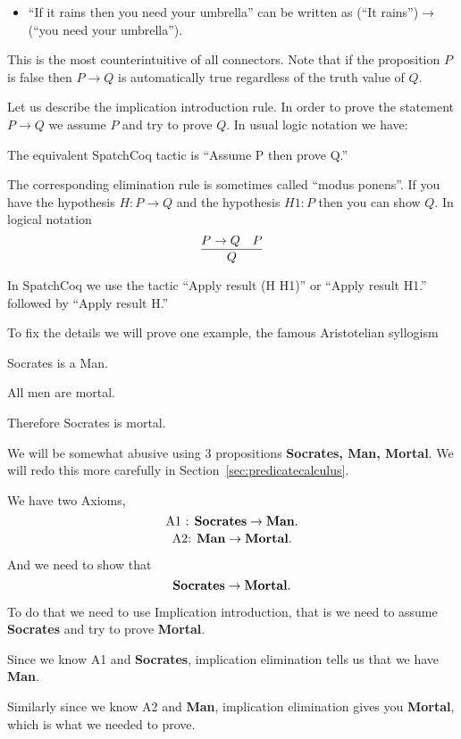\begin{itemize}
\item ``If it rains then you need your umbrella'' can be written as (``It rains'')$\rightarrow$(``you need your umbrella'').

\end{itemize}
This is the most counterintuitive of all connectors. Note that if the proposition $P$ is false then $P\rightarrow Q$ is automatically true regardless of the truth value of $Q$.

Let us describe the implication introduction rule.  In order to prove the statement $P\rightarrow Q$ we  assume $P$ and try to prove $Q$. In usual logic notation we have:


The equivalent SpatchCoq tactic is ``Assume P then prove Q.''


The corresponding elimination rule is sometimes called ``modus ponens''. If you have the hypothesis $H:P\rightarrow Q$ and the hypothesis $H1:P$ then you can show $Q$. In logical notation
$$\infer{Q}{P\rightarrow Q & P}$$

In SpatchCoq we use the tactic ``Apply result (H H1)'' or ``Apply result H1.'' followed by ``Apply result H.''



To fix the details we will prove one example, the famous Aristotelian syllogism 

Socrates is a Man.

All men are mortal.

Therefore Socrates is mortal.

We will be somewhat abusive using 3 propositions {\bf Socrates, Man, Mortal}. We will redo this more carefully in Section~\ref{sec:predicatecalculus}.

We have two Axioms, 
$$\mbox{A1 :  \bf Socrates} \rightarrow \mbox{\bf Man}.$$
$$\mbox{A2: \bf  Man} \rightarrow \mbox{\bf Mortal}.$$

And we need to show that $$\mbox{\bf Socrates} \rightarrow \mbox{\bf Mortal}.$$

To do that we need to use Implication introduction, that is we need to assume {\bf Socrates} and try to prove {\bf Mortal}. 

Since we know  A1 and {\bf Socrates}, implication elimination tells us that we have {\bf Man}. 

Similarly since we know A2 and {\bf Man}, implication elimination gives you {\bf Mortal}, which is what we needed to prove.

